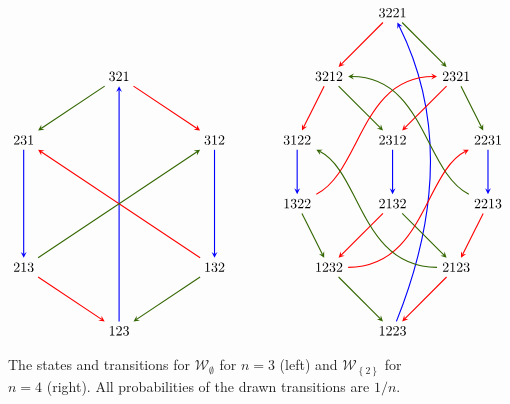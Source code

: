 \documentclass[reqno]{amsart}
\newcommand{\0}{\phantom{c}}
\newcommand{\mcW}{\mathcal{W}}
\newcommand{\set}[1]{\left\{ #1 \right\}}
\theoremstyle{plain}
\theoremstyle{definition}
\numberwithin{equation}{section}
\begin{document}
\begin{figure}
\[
\begin{tikzpicture}[>=stealth,thick,scale=0.8]
\node (321) at (3,8) {$321$};
\node (231) at (0,6) {$231$};
\node (312) at (6,6) {$312$};
\node (213) at (0,2) {$213$};
\node (132) at (6,2) {$132$};
\node (123) at (3,0) {$123$};
\draw[->,blue] (123) -- (321); %
\draw[->,dgreencolor] (132) -- (123); %
\draw[->,red] (132) -- (231); %
\draw[->,red] (213) -- (123); %
\draw[->,dgreencolor] (213) -- (312); %
\draw[->,blue] (231) -- (213); %
\draw[->,blue] (312) -- (132); %
\draw[->,dgreencolor] (321) -- (231); %
\draw[->,red] (321) -- (312); %
\end{tikzpicture}
\hspace{35pt}
\begin{tikzpicture}[>=stealth,thick,scale=0.8]
\node (1223) at (0,-2) {$1223$};
\node (3221) at (0,8) {$3221$};
\node (2321) at (2,6) {$2321$};
\node (3212) at (-2,6) {$3212$};
\node (2231) at (3,4) {$2231$};
\node (2312) at (0,4) {$2312$};
\node (3122) at (-3,4) {$3122$};
\node (2213) at (3,2) {$2213$};
\node (2132) at (0,2) {$2132$};
\node (1322) at (-3,2) {$1322$};
\node (1232) at (-2,0) {$1232$};
\node (2123) at (2,0) {$2123$};
\draw[->,blue] (1223) .. controls (2,3) and (1,6) .. (3221);
\draw[->,red] (3221) -- (3212);
\draw[->,dgreencolor] (3221) -- (2321);
\draw[->,dgreencolor] (2321) -- (2231);
\draw[->,red] (2321) -- (2312);
\draw[->,red] (3212) -- (3122);
\draw[->,dgreencolor] (3212) -- (2312);
\draw[->,blue] (3122) -- (1322);
\draw[->,blue] (2312) -- (2132);
\draw[->,blue] (2231) -- (2213);
\draw[->,dgreencolor] (1322) -- (1232);
\draw[->,red] (1322)  .. controls (-1,3) and (-1,6) .. (2321);
\draw[->,dgreencolor] (2132) -- (2123);
\draw[->,red] (2132) -- (1232);
\draw[->,dgreencolor] (2213) .. controls (1,3) and (1,6) .. (3212);
\draw[->,red] (2213) -- (2123);
\draw[->,dgreencolor] (1232) -- (1223);
\draw[->,red] (1232) .. controls (1,0) and (1,3) .. (2231);
\draw[->,red] (2123) -- (1223);
\draw[->,dgreencolor] (2123) .. controls (-1,0) and (-1,3) .. (3122);
\end{tikzpicture}
\]
\caption{The states and transitions for $\mcW_{\emptyset}$ for $n =3$ (left) and $\mcW_{\set{2}}$ for $n = 4$ (right).
All probabilities of the drawn transitions are $1/n$.}
\end{figure}
\end{document}
